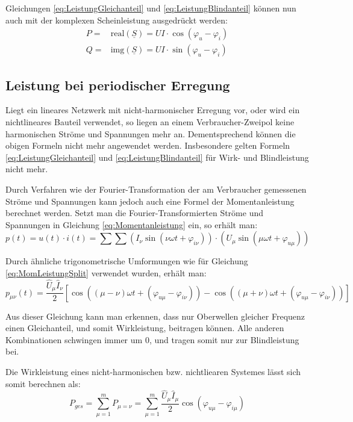 Gleichungen \eqref{eq:LeistungGleichanteil} und \eqref{eq:LeistungBlindanteil} können nun auch mit der komplexen Scheinleistung ausgedrückt werden:
\begin{eqnarray*}
P=& \mbox{real}(\underline{S}) = UI\cdot \cos(\varphi_u-\varphi_i)\\
Q=& \mbox{img}(\underline{S}) = UI\cdot \sin(\varphi_u-\varphi_i)
\end{eqnarray*}

\subsection{Leistung bei periodischer Erregung}
Liegt ein lineares Netzwerk mit nicht-harmonischer Erregung vor, oder wird ein nichtlineares Bauteil verwendet, so liegen an einem Verbraucher-Zweipol keine harmonischen Ströme und Spannungen mehr an. Dementsprechend können die obigen Formeln nicht mehr angewendet werden. Insbesondere gelten Formeln \eqref{eq:LeistungGleichanteil} und \eqref{eq:LeistungBlindanteil} für Wirk- und Blindleistung nicht mehr.

Durch Verfahren wie der Fourier-Transformation der am Verbraucher gemessenen Ströme und Spannungen kann jedoch auch eine Formel der Momentanleistung berechnet werden. Setzt man die Fourier-Transformierten Ströme und Spannungen in Gleichung \eqref{eq:Momentanleistung} ein, so erhält man:
\begin{equation*}
p(t)=u(t)\cdot i(t) = \sum\sum\left(I_\nu\sin(\nu \omega t+ \varphi_{i\nu})\right) \cdot \left(U_\mu\sin(\mu \omega t + \varphi_{u\mu})\right)
\end{equation*}

Durch ähnliche trigonometrische Umformungen wie für Gleichung \eqref{eq:MomLeistungSplit} verwendet wurden, erhält man:
\begin{equation}
p_{\mu\nu}(t)=\frac{\hat{U}_\mu\hat{I}_\nu}{2}\left[\cos((\mu-\nu)\omega t + (\varphi_{u\mu}-\varphi_{i\nu}))-\cos((\mu+\nu)\omega t + (\varphi_{u\mu}-\varphi_{i\nu}))\right]
\end{equation}

Aus dieser Gleichung kann man erkennen, dass nur Oberwellen gleicher Frequenz einen Gleichanteil, und somit Wirkleistung, beitragen können. Alle anderen Kombinationen schwingen immer um 0, und tragen somit nur zur Blindleistung bei.

Die Wirkleistung eines nicht-harmonischen bzw. nichtliearen Systemes lässt sich somit berechnen als:
\begin{equation}
P_{ges}=\sum_{\mu = 1}^mP_{\mu=\nu}=\sum_{\mu = 1}^m\frac{\hat{U}_\mu\hat{I}_\mu}{2}\cos(\varphi_{u\mu}-\varphi_{i\mu}) \label{eq:WirkleistungFourier}
\end{equation}


